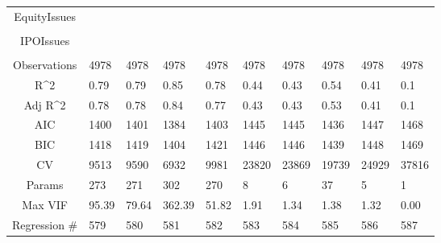 \documentclass{article}
\begin{document}
\begin{table}[H]
\begin{tabular}{|clllllllll|}
  EquityIssues &  &  &  &  &  &  &  &  &  \\ 
   &  &  &  &  &  &  &  &  &  \\ 
  IPOIssues &  &  &  &  &  &  &  &  &  \\ 
   &  &  &  &  &  &  &  &  &  \\ 
  \hline 
 Observations & 4978 & 4978 & 4978 & 4978 & 4978 & 4978 & 4978 & 4978 & 4978 \\ 
  R^2 & 0.79 & 0.79 & 0.85 & 0.78 & 0.44 & 0.43 & 0.54 & 0.41 & 0.1 \\ 
  Adj R^2 & 0.78 & 0.78 & 0.84 & 0.77 & 0.43 & 0.43 & 0.53 & 0.41 & 0.1 \\ 
  AIC & 1400 & 1401 & 1384 & 1403 & 1445 & 1445 & 1436 & 1447 & 1468 \\ 
  BIC & 1418 & 1419 & 1404 & 1421 & 1446 & 1446 & 1439 & 1448 & 1469 \\ 
  CV & 9513 & 9590 & 6932 & 9981 & 23820 & 23869 & 19739 & 24929 & 37816 \\ 
  Params & 273 & 271 & 302 & 270 & 8 & 6 & 37 & 5 & 1 \\ 
  Max VIF & 95.39 & 79.64 & 362.39 & 51.82 & 1.91 & 1.34 & 1.38 & 1.32 & 0.00 \\ 
  Regression \# & 579 & 580 & 581 & 582 & 583 & 584 & 585 & 586 & 587 \\ 
   \hline
\end{tabular}
 
\end{table}
\end{document}
